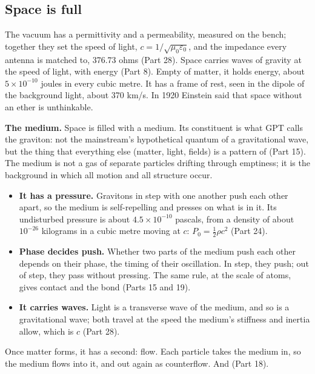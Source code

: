 \subsection{Space is full}

 The vacuum has a permittivity and a permeability, measured on the bench; together they set the speed of light, $c = 1/\sqrt{\mu_0\varepsilon_0}$, and the impedance every antenna is matched to, 376.73 ohms (Part 28). Space carries waves of gravity at the speed of light, with energy (Part 8). Empty of matter, it holds energy, about $5\times10^{-10}$ joules in every cubic metre. It has a frame of rest, seen in the dipole of the background light, about 370 km/s. In 1920 Einstein said that space without an ether is unthinkable.

\begin{hypbar}
\textbf{The medium.} Space is filled with a medium. Its constituent is what GPT calls the graviton: not the mainstream's hypothetical quantum of a gravitational wave, but the thing that everything else (matter, light, fields) is a pattern of (Part 15).\footnotemark{} The medium is not a gas of separate particles drifting through emptiness; it is the background in which all motion and all structure occur.
\begin{itemize}
\item \textbf{It has a pressure.} Gravitons in step with one another push each other apart, so the medium is self-repelling and presses on what is in it. Its undisturbed pressure is about $4.5\times10^{-10}$ pascals, from a density of about $10^{-26}$ kilograms in a cubic metre moving at $c$: $P_0 = \tfrac12\rho c^2$ (Part 24).
\item \textbf{Phase decides push.} Whether two parts of the medium push each other depends on their phase, the timing of their oscillation. In step, they push; out of step, they pass without pressing. The same rule, at the scale of atoms, gives contact and the bond (Parts 15 and 19).
\item \textbf{It carries waves.} Light is a transverse wave of the medium, and so is a gravitational wave; both travel at the speed the medium's stiffness and inertia allow, which is $c$ (Part 28).
\end{itemize}
\end{hypbar}

 Once matter forms, it has a second: flow. Each particle takes the medium in, so the medium flows into it, and out again as counterflow. And  (Part 18).

